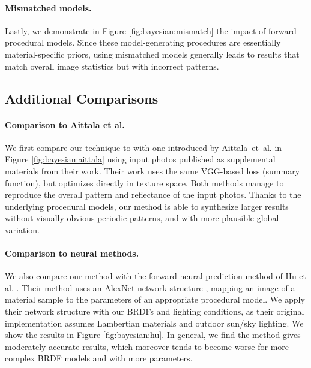 

\paragraph{Mismatched models.}
Lastly, we demonstrate in Figure \ref{fig:bayesian:mismatch} the impact of forward procedural models.
Since these model-generating procedures are essentially material-specific priors, using mismatched models generally leads to results that match overall image statistics but with incorrect patterns.

\subsection{Additional Comparisons}



\paragraph{Comparison to Aittala et al.}
We first compare our technique to with one introduced by Aittala~et~al. \cite{aittala2016reflectance} in Figure \ref{fig:bayesian:aittala} using input photos published as supplemental materials from their work.
Their work uses the same VGG-based loss (summary function), but optimizes directly in texture space. Both methods manage to reproduce the overall pattern and reflectance of the input photos.
Thanks to the underlying procedural models, our method is able to synthesize larger results without visually obvious periodic patterns, and with more plausible global variation.



\paragraph{Comparison to neural methods.}
We also compare our method with the forward neural prediction method of Hu et al. \cite{hu2019novel}. Their method uses an AlexNet network structure \cite{krizhevsky2012imagenet}, mapping an image of a material sample to the parameters of an appropriate procedural model. We apply their network structure with our BRDFs and lighting conditions, as their original implementation assumes Lambertian materials and outdoor sun/sky lighting. We show the results in Figure \ref{fig:bayesian:hu}. In general, we find the method gives moderately accurate results, which moreover tends to become worse for more complex BRDF models and with more parameters.

